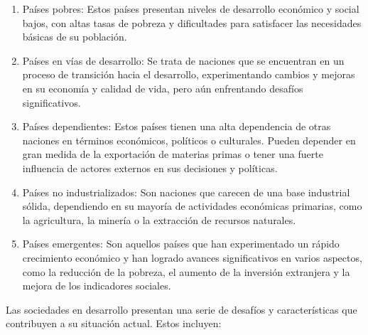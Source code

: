 \documentclass[
  a4paper,
]{article}
\begin{document}
\begin{enumerate}
\def\labelenumi{\arabic{enumi}.}
\item
  Países pobres: Estos países presentan niveles de desarrollo económico
  y social bajos, con altas tasas de pobreza y dificultades para
  satisfacer las necesidades básicas de su población.
\item
  Países en vías de desarrollo: Se trata de naciones que se encuentran
  en un proceso de transición hacia el desarrollo, experimentando
  cambios y mejoras en su economía y calidad de vida, pero aún
  enfrentando desafíos significativos.
\item
  Países dependientes: Estos países tienen una alta dependencia de otras
  naciones en términos económicos, políticos o culturales. Pueden
  depender en gran medida de la exportación de materias primas o tener
  una fuerte influencia de actores externos en sus decisiones y
  políticas.
\item
  Países no industrializados: Son naciones que carecen de una base
  industrial sólida, dependiendo en su mayoría de actividades económicas
  primarias, como la agricultura, la minería o la extracción de recursos
  naturales.
\item
  Países emergentes: Son aquellos países que han experimentado un rápido
  crecimiento económico y han logrado avances significativos en varios
  aspectos, como la reducción de la pobreza, el aumento de la inversión
  extranjera y la mejora de los indicadores sociales.
\end{enumerate}

Las sociedades en desarrollo presentan una serie de desafíos y
características que contribuyen a su situación actual. Estos incluyen:
\end{document}
